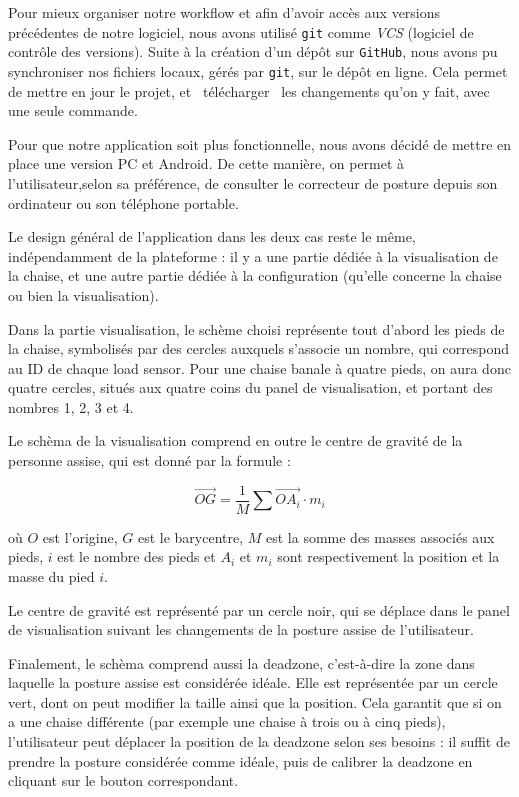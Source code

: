 \documentclass{polytech/polytech}
\begin{document}
Pour mieux organiser notre workflow et afin d'avoir accès aux versions précédentes de notre logiciel, nous avons utilisé \texttt{git} comme \textit{VCS} (logiciel de contrôle des versions). Suite à la création d'un dépôt sur \texttt{GitHub}, nous avons pu synchroniser nos fichiers locaux, gérés par \texttt{git}, sur le dépôt en ligne. Cela permet de mettre en jour le projet, et \guillemotleft\ télécharger \guillemotright\ les changements qu'on y fait, avec une seule commande.

Pour que notre application soit plus fonctionnelle, nous avons décidé de mettre en place une version PC et Android. De cette manière, on permet à l'utilisateur,selon sa préférence, de consulter le correcteur de posture depuis son ordinateur ou son téléphone portable.

Le design général de l'application dans les deux cas reste le même, indépendamment de la plateforme : il y a une partie dédiée à la visualisation de la chaise, et une autre partie dédiée à la configuration (qu'elle concerne la chaise ou bien la visualisation). 

Dans la partie visualisation, le schème choisi représente tout d'abord les pieds de la chaise, symbolisés par des cercles auxquels s'associe un nombre, qui correspond au ID de chaque load sensor. Pour une chaise banale à quatre pieds, on aura donc quatre cercles, situés aux quatre coins du panel de visualisation, et portant des nombres 1, 2, 3 et 4. 

Le schèma de la visualisation comprend en outre le centre de gravité de la personne assise, qui est donné par la formule :

$$\vec{OG} = \frac{1}{M} \sum \vec{OA_i} \cdot m_i$$

où $O$ est l'origine, $G$ est le barycentre, $M$ est la somme des masses associés aux pieds, $i$ est le nombre des pieds et $A_i$ et $m_i$ sont respectivement la position et la masse du pied $i$.

Le centre de gravité est représenté par un cercle noir, qui se déplace dans le panel de visualisation suivant les changements de la posture assise de l'utilisateur.

Finalement, le schèma comprend aussi la deadzone, c'est-à-dire la zone dans laquelle la posture assise est considérée idéale. Elle est représentée par un cercle vert, dont on peut modifier la taille ainsi que la position. Cela garantit que si on a une chaise différente (par exemple une chaise à trois ou à cinq pieds), l'utilisateur peut déplacer la position de la deadzone selon ses besoins : il suffit de prendre la posture considérée comme idéale, puis de calibrer la deadzone en cliquant sur le bouton correspondant.
\end{document}
